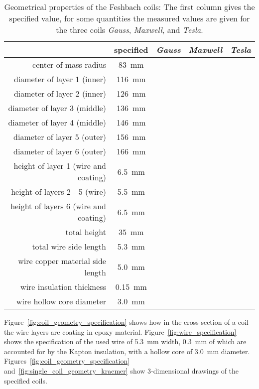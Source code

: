 \begin{table}
    \centering
    \begin{tabular}{rcccc}
        \toprule
        & \textbf{specified} & \textbf{\textit{Gauss}} & \textbf{\textit{Maxwell}} & \textbf{\textit{Tesla}} \\
        \toprule
        center-of-mass radius & \SI{83}{\milli\meter} &&& \\
        diameter of layer 1 (inner) & \SI{116}{\milli\meter} &&& \\
        diameter of layer 2 (inner) & \SI{126}{\milli\meter} &&& \\
        diameter of layer 3 (middle) & \SI{136}{\milli\meter} &&& \\
        diameter of layer 4 (middle) & \SI{146}{\milli\meter} &&& \\
        diameter of layer 5 (outer) & \SI{156}{\milli\meter} &&& \\
        diameter of layer 6 (outer) & \SI{166}{\milli\meter} &&& \\
        height of layer 1 (wire and coating) & \SI{6.5}{\milli\meter} &&& \\
        height of layers 2 - 5 (wire) & \SI{5.5}{\milli\meter} &&& \\
        height of layers 6 (wire and coating) & \SI{6.5}{\milli\meter} &&& \\
        total height & \SI{35}{\milli\meter} &&& \\
        total wire side length &  \SI{5.3}{\milli\meter} &&& \\
        wire copper material side length & \SI{5.0}{\milli\meter} &&& \\
        wire insulation thickness & \SI{0.15}{\milli\meter} \\
        wire hollow core diameter & \SI{3.0}{\milli\meter} &&& \\
        \bottomrule
    \end{tabular}
    \caption{Geometrical properties of the Feshbach coils: The first column gives the specified value, for some quantities the measured values are given for the three coils \textit{Gauss}, \textit{Maxwell}, and \textit{Tesla}.
    }
    \label{tab:coil_geometrical_properties}
\end{table}

Figure~\ref{fig:coil_geometry_specification} shows how in the cross-section of a coil the wire layers are coating in epoxy material. Figure~\ref{fig:wire_specification} shows the specification of the used wire of \SI{5.3}{\milli\meter} width, \SI{0.3}{\milli\meter} of which are accounted for by the Kapton insulation, with a hollow core of \SI{3.0}{\milli\meter} diameter. Figures~\ref{fig:coil_geometry_specification} and~\ref{fig:single_coil_geometry_kraemer} show 3-dimensional drawings of the specified coils.

